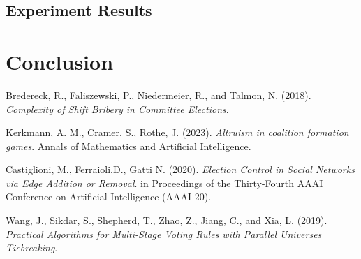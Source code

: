 \documentclass{article}
\begin{document}
\subsection{Experiment Results}

\section{Conclusion}





\begin{thebibliography}{9}

Bredereck, R., Faliszewski, P., Niedermeier, R., and Talmon, N. (2018). 
\textit{Complexity of Shift Bribery in Committee Elections}. 

Kerkmann, A. M., Cramer, S., Rothe, J. (2023). 
\textit{Altruism in coalition formation games}. 
Annals of Mathematics and Artificial Intelligence.

Castiglioni, M.,  Ferraioli,D., Gatti N. (2020).
\textit{Election Control in Social Networks via Edge Addition or Removal}.
in Proceedings of the Thirty-Fourth AAAI Conference on Artificial Intelligence (AAAI-20).

Wang, J., Sikdar, S., Shepherd, T., Zhao, Z., Jiang, C., and Xia, L. (2019). 
\textit{Practical Algorithms for Multi-Stage Voting Rules with Parallel Universes Tiebreaking}.



\end{thebibliography}
\end{document}
